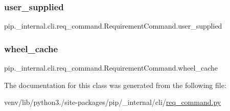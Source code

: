 \subsubsection{\texorpdfstring{user\+\_\+supplied}{user\_supplied}}
{\footnotesize\ttfamily pip.\+\_\+internal.\+cli.\+req\+\_\+command.\+Requirement\+Command.\+user\+\_\+supplied\hspace{0.3cm}{\ttfamily [static]}}

\mbox{\label{classpip_1_1__internal_1_1cli_1_1req__command_1_1RequirementCommand_a840ed93b1c2fe6c75197967f3a05a914}} 
\subsubsection{\texorpdfstring{wheel\+\_\+cache}{wheel\_cache}}
{\footnotesize\ttfamily pip.\+\_\+internal.\+cli.\+req\+\_\+command.\+Requirement\+Command.\+wheel\+\_\+cache\hspace{0.3cm}{\ttfamily [static]}}



The documentation for this class was generated from the following file\+:\begin{DoxyCompactItemize}
\item 
venv/lib/python3./site-\/packages/pip/\+\_\+internal/cli/\hyperlink{req__command_8py}{req\+\_\+command.\+py}\end{DoxyCompactItemize}
